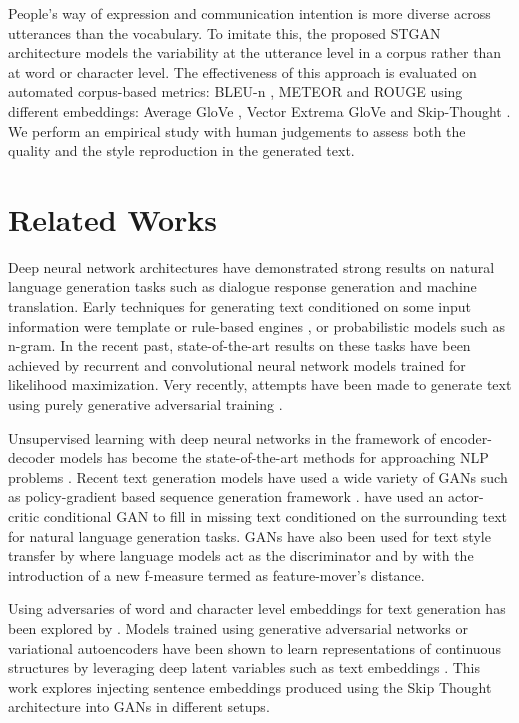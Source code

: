\documentclass[11pt,a4paper]{article}
\begin{document}
People's way of expression and communication intention is more diverse across utterances than the vocabulary. To imitate this, the proposed STGAN architecture models the variability at the utterance level in a corpus rather than at word or character level. The effectiveness of this approach is evaluated on automated corpus-based metrics: BLEU-n \cite{BLEU}, METEOR \cite{meteor} and ROUGE \cite{ROUGE} using different embeddings: Average GloVe \cite{glove}, Vector Extrema GloVe \cite{glove} and Skip-Thought \cite{kiros2015skip}.
We perform an empirical study with human judgements to assess both the quality and the style reproduction in the generated text.

\section{Related Works}

Deep neural network architectures have demonstrated strong results on natural language generation tasks such as dialogue response generation and machine translation. Early techniques for generating text conditioned on some input information were template or rule-based engines \cite{mcyag}, or probabilistic models 
such as n-gram. In the recent past, state-of-the-art results on these tasks have been 
achieved by recurrent \cite{rgan, rnn} and convolutional neural network models trained 
for likelihood maximization. Very recently, attempts have been made to generate text using purely generative adversarial training \cite{WGAN}. 

Unsupervised learning with deep neural networks in the framework of encoder-decoder models has become the state-of-the-art methods for approaching NLP problems \cite{recent}. Recent text generation models have used a wide variety of GANs such as policy-gradient based sequence generation framework \cite{seqgan}.  have used an actor-critic conditional GAN to fill in missing text conditioned on the surrounding text for natural language generation tasks. GANs have also been used for text style transfer by  where language models act as the discriminator and by  with the introduction of a new f-measure termed as feature-mover's distance. 

Using adversaries of word and character level embeddings for text generation has been explored by . Models trained using generative adversarial networks or variational autoencoders have been shown to learn representations of continuous structures by leveraging deep latent variables such as text embeddings \cite{arae}.  This work explores injecting sentence embeddings produced using the Skip Thought architecture \cite{kiros2015skip} into GANs in different setups.
\end{document}
